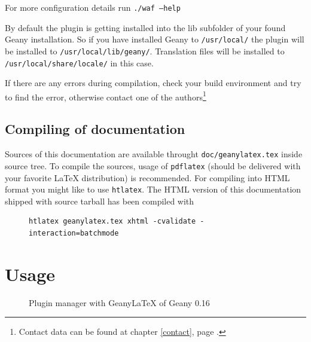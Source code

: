 \documentclass[%
a4paper,%
10pt,%
oneside,%
DIV18,
headsepline,
plainheadsepline,
footsepline,
plainfootsepline,
bibtotoc,%
liststotoc,%
BCOR12mm,%
halfparskip,%
openany,%
]{scrartcl}
\begin{document}
For more configuration details run \texttt{./waf --help}

By default the plugin is getting installed into the lib subfolder of
your found Geany installation. So if you have installed Geany to
\texttt{/usr/local/} the plugin will be installed to
\texttt{/usr/local/lib/geany/}. Translation files will be installed to
\texttt{/usr/local/share/locale/} in this case.

If there are any errors during compilation, check your build environment
and try to find the error, otherwise contact one of the
authors\footnote{Contact data can be found at chapter \ref{contact},
page \pageref{contact}.}

\subsection{Compiling of documentation}
\label{sec:compiling_of_documentation}
Sources of this documentation are available throught
\texttt{doc/geanylatex.tex} inside source tree. To compile the sources,
usage of \texttt{pdflatex} (should be delivered with your favorite
\LaTeX{} distribution) is recommended. For compiling into HTML format you
might like to use \texttt{htlatex}. The HTML version of this documentation
shipped with source tarball has been compiled with

\begin{figure}[h!]
\begin{lstlisting}
htlatex geanylatex.tex xhtml -cvalidate -interaction=batchmode
\end{lstlisting}
\end{figure}

\section{Usage}
\begin{figure}[h!]
	\caption{Plugin manager with Geany\LaTeX{} of Geany 0.16}
\end{figure}
\end{document}
